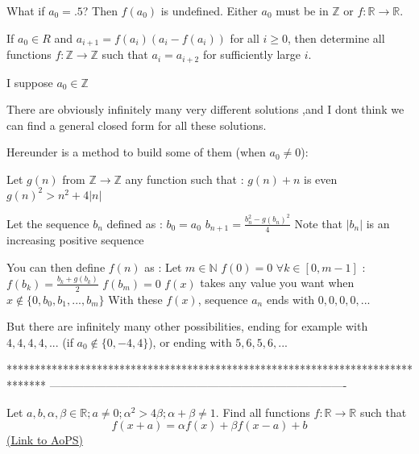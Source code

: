 \begin{solution}
	What if $a_0=.5$?  Then $f(a_0)$ is undefined.  Either $a_0$ must be in $\mathbb{Z}$ or $f:\mathbb{R}\rightarrow\mathbb{R}$.
\end{solution}



\begin{solution}
	\begin{tcolorbox}If $a_0{\in}R$ and $a_{i+1}=f(a_i)(a_i-f(a_i))$ for all $i{\ge}0$, then determine all functions $f: \mathbb{Z}\to\mathbb{Z}$ such that $a_i=a_{i+2}$ for sufficiently large $i$.\end{tcolorbox}
I suppose $a_0 \in\mathbb Z$

There are obviously infinitely many very different solutions ,and I dont think we can find a general closed form for all these solutions.

Hereunder is a method to build some of them (when $a_0\ne 0$):

Let $g(n)$ from $\mathbb Z\to \mathbb Z$ any function such that :
$g(n)+n$ is even
$g(n)^2>n^2+4|n|$

Let the sequence $b_n$ defined as :
$b_0=a_0$
$b_{n+1}=\frac{b_n^2-g(b_n)^2}4$
Note that $|b_n|$ is an increasing positive sequence

You can then define $f(n)$ as :
Let $m\in\mathbb N$
$f(0)=0$
$\forall k\in[0,m-1]$ : $f(b_k)=\frac{b_k+g(b_k)}2$
$f(b_m)=0$
$f(x)$ takes any value you want when $x\notin\{0,b_0,b_1, ..., b_m\}$
With these $f(x)$, sequence $a_n$ ends with $0,0,0,0,...$


But there are infinitely many other possibilities, ending for example with $4,4,4,4,...$ (if $a_0\notin\{0,-4,4\}$), or ending with $5,6,5,6,...$
\end{solution}
*******************************************************************************
-------------------------------------------------------------------------------

\begin{problem}
	Let $a,b,\alpha, \beta \in \mathbb{R}; a\neq 0;\alpha^2> 4\beta ;\alpha+ \beta \neq 1$. Find all functions $f:\mathbb{R}\to\mathbb{R}$ such that 
\[f(x+a)=\alpha f(x)+\beta f(x-a)+b\]
	\flushright \href{https://artofproblemsolving.com/community/c6h562410}{(Link to AoPS)}
\end{problem}



